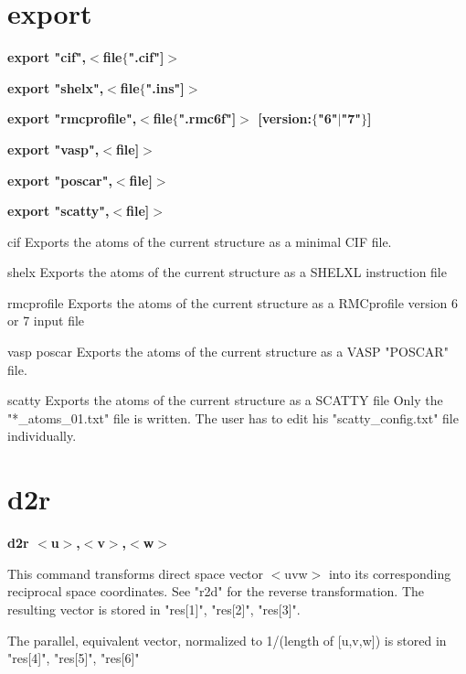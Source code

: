 \section{export}
{\bf export "cif",$ <$file$ \{$".cif"]$> $ \par }
{\bf export "shelx",$ <$file$ \{$".ins"]$> $ \par }
{\bf export "rmcprofile",$ <$file$ \{$".rmc6f"]$> $  [version:$ \{$"6"$| $"7"$\} $] \par }
{\bf export "vasp",$ <$file]$> $ \par }
{\bf export "poscar",$ <$file]$> $ \par }
{\bf export "scatty",$ <$file]$> $ \par }
\par
\vspace{3pt}
cif 
Exports the atoms of the current structure as a minimal CIF 
file. 
\par
shelx 
Exports the atoms of the current structure as a SHELXL instruction file 
\par
rmcprofile 
Exports the atoms of the current structure as a RMCprofile 
version 6 or 7 input file 
\par
vasp 
poscar 
Exports the atoms of the current structure as a VASP "POSCAR" file. 
\par
scatty 
Exports the atoms of the current structure as a SCATTY file 
Only the "*\_atoms\_01.txt" file is written. The user has to edit his 
"scatty\_config.txt" file individually. 
\section{d2r}
{\bf d2r $ <$u$> $,$ <$v$> $,$ <$w$> $ \par }
\par
\vspace{3pt}
This command transforms direct space vector $ <$uvw$> $ into its corresponding 
reciprocal space coordinates. See "r2d" for the reverse transformation. 
The resulting vector is stored in "res[1]", "res[2]", "res[3]". 
\par
The parallel, equivalent vector, normalized to 1/(length of [u,v,w]) 
is stored in "res[4]", "res[5]", "res[6]" 
